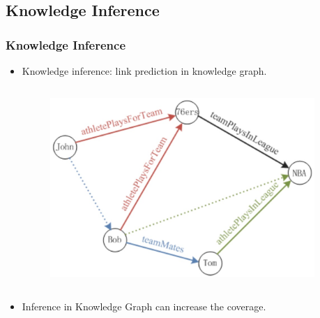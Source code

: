 \documentclass[pdf,10pt]{beamer}
\begin{document}
\subsection{Knowledge Inference}
\begin{frame}
\frametitle{Knowledge Inference}
\begin{itemize}
	\item Knowledge inference: link prediction in knowledge graph.

	\begin{columns}[onlytextwidth]
		\begin{column}{0.45\textwidth}
			\begin{figure}
				\includegraphics[width=.45\textwidth,natwidth=610,natheight=610]{4.eps}
			\end{figure}
		\end{column}
		\begin{column}{0.45\textwidth}
			\begin{itemize}
			\end{itemize}
		\end{column}
	\end{columns}
	\item Inference in Knowledge Graph can increase the coverage.
\end{itemize}
\end{frame}
\end{document}
